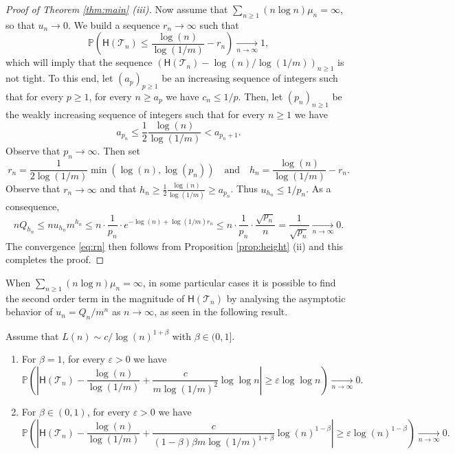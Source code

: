 \documentclass[a4paper,11pt]{article}
\DeclareRobustCommand{\P}{\mathbb{P}}
\DeclareRobustCommand{\to}{\xrightarrow[n\rightarrow \infty]{}}
\begin{document}
\begin{proof}[Proof of Theorem \ref{thm:main} (iii)]
Now assume that  $\sum_{n \geq 1} (n \log n) \mu_{n} =\infty$, so that $u_{n} \rightarrow 0$. We build a sequence $r_{n} \rightarrow \infty$ such that
\begin{equation}
\label{eq:rn}
\P\left( {\mathsf{H}(\mathcal{T}_n)} \leq  \frac{\log(n)}{\log(1/m)} -r_{n}\right) \to 1,
\end{equation}
which will imply that the sequence $ \left({\mathsf{H}(\mathcal{T}_n)}- {\log(n)}/{\log(1/m)} \right)_{n \geq 1}$ is not tight. To this end, let $(a_{p})_{p \geq 1}$ be an increasing sequence of integers such that for every $p \geq 1$, for every $n \geq a_p$ we have $c_{n} \leq 1/p$. Then, let $(p_{n})_{n \geq 1}$ be the weakly increasing sequence of integers such that for every $n \geq 1$ we have
$$a_{p_{n}} \leq \frac{1}{2} \frac{\log(n)}{\log(1/m)} < a_{p_{n}+1}.$$
Observe that $p_{n} \rightarrow \infty$. Then set
$$r_{n}= \frac{1}{2 \log(1/m)} \min \left(  \log(n), \log({p_{n}}) \right) \quad \textrm{and} \quad  h_{n}=\frac{\log(n)}{\log(1/m)} -{r_{n}} .$$
Observe that $r_{n} \rightarrow \infty$ and that $h_{n} \geq  \frac{1}{2} \frac{\log(n)}{\log(1/m)} \geq a_{p_{n}}$. Thus $ u_{h_{n}} \leq 1/p_{n}$. As a consequence,
$$n Q_{ h_{n}} \leq n u_{h_n} m^{h_n} \leq n \cdot \frac{1}{p_{n}}  \cdot e^{-\log(n)+\log(1/m) r_n}    \leq  n \cdot \frac{1}{p_{n}}  \cdot \frac{\sqrt{p_n}}{n}  = \frac{1}{\sqrt{p_{n}}} \to 0.$$
The convergence \eqref{eq:rn}  then follows from Proposition \ref{prop:height} (ii) and this completes the proof.
\end{proof}


When $\sum_{n \geq 1}  (n \log n) \mu_{n}  =\infty$, in some particular cases it is possible to find the second order term in the magnitude of $\mathsf{H}(\mathcal{T}_{n})$ by analysing the asymptotic behavior of $u_n=Q_n/m^n$ as $n\rightarrow\infty$, as seen in the following result.

\begin{proposition}
\label{prop:ex}
Assume that $L(n) \sim c/\log(n)^{1+\beta}$ with $\beta \in (0,1]$.
\begin{enumerate}
\item[(i)] For $\beta=1$, for every $\varepsilon>0$ we have
$$ \P\left( \left| {\mathsf{H}(\mathcal{T}_n)}-  \frac{\log(n)}{\log(1/m)} + \frac{c}{ m \log(1/m)^2} \log \log n \right| \geq \varepsilon \log \log n\right) \to 0.$$
\item[(ii)] For $\beta \in (0,1)$, for every $\varepsilon>0$  we have
$$ \P\left( \left| {\mathsf{H}(\mathcal{T}_n)}-  \frac{\log(n)}{\log(1/m)} + \frac{c}{(1-\beta)\beta m \log(1/m)^{1+\beta}} \log(n)^{1-\beta} \right| \geq \varepsilon \log(n)^{1-\beta} \right) \to 0.$$
\end{enumerate}
\end{proposition}
\end{document}
